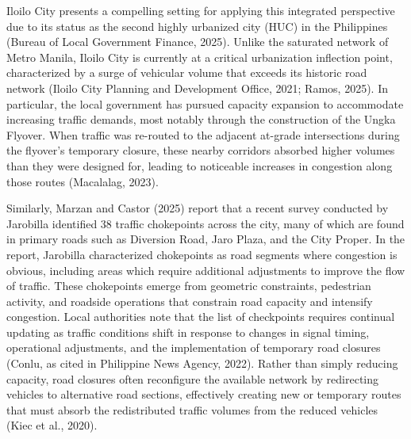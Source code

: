Iloilo City presents a compelling setting for applying this integrated perspective due to its status as the second highly urbanized city (HUC) in the Philippines (Bureau of Local Government Finance, 2025). Unlike the saturated network of Metro Manila, Iloilo City is currently at a critical urbanization inflection point, characterized by a surge of vehicular volume that exceeds its historic road network (Iloilo City Planning and Development Office, 2021; Ramos, 2025). In particular, the local government has pursued capacity expansion to accommodate increasing traffic demands, most notably through the construction of the Ungka Flyover. When traffic was re-routed to the adjacent at-grade intersections during the flyover's temporary closure, these nearby corridors absorbed higher volumes than they were designed for, leading to noticeable increases in congestion along those routes (Macalalag, 2023).

Similarly, Marzan and Castor (2025) report that a recent survey conducted by Jarobilla identified 38 traffic chokepoints across the city, many of which are found in primary roads such as Diversion Road, Jaro Plaza, and the City Proper. In the report, Jarobilla characterized chokepoints as road segments where congestion is obvious, including areas which require additional adjustments to improve the flow of traffic. These chokepoints emerge from geometric constraints, pedestrian activity, and roadside operations that constrain road capacity and intensify congestion. Local authorities note that the list of checkpoints requires continual updating as traffic conditions shift in response to changes in signal timing, operational adjustments, and the implementation of temporary road closures (Conlu, as cited in Philippine News Agency, 2022). Rather than simply reducing capacity, road closures often reconfigure the available network by redirecting vehicles to alternative road sections, effectively creating new or temporary routes that must absorb the redistributed traffic volumes from the reduced vehicles (Kiec et al., 2020).  

